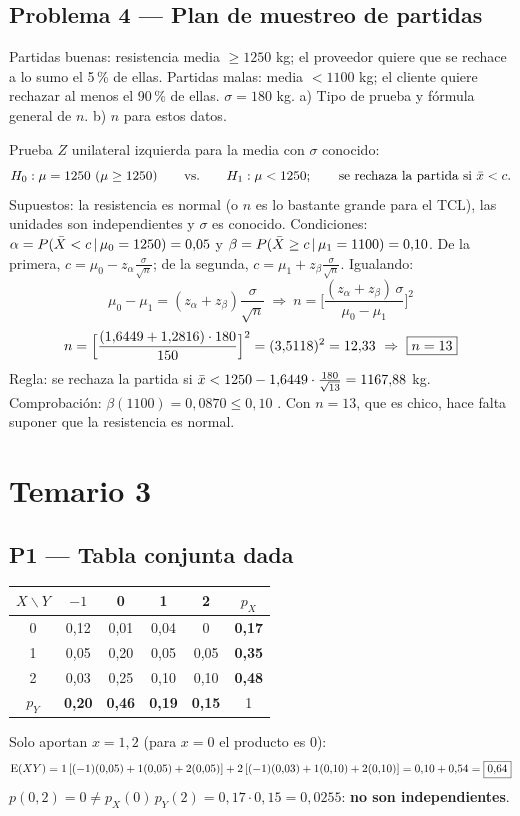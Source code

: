 \subsection{Problema 4 --- Plan de muestreo de partidas}
\begin{enun}
Partidas buenas: resistencia media $\ge1250$ kg; el proveedor quiere que se rechace a lo sumo el 5\,\% de ellas. Partidas malas: media $<1100$ kg; el cliente quiere rechazar al menos el 90\,\% de ellas. $\sigma=180$ kg. a) Tipo de prueba y fórmula general de $n$. b) $n$ para estos datos.
\end{enun}
Prueba $Z$ unilateral izquierda para la media con $\sigma$ conocido:
\[
H_0:\mu=1250\ (\mu\ge1250)\qquad\text{vs.}\qquad H_1:\mu<1250;\qquad\text{se rechaza la partida si }\xb<c.
\]
Supuestos: la resistencia es normal (o $n$ es lo bastante grande para el TCL), las unidades son independientes y $\sigma$ es conocido.
Condiciones: $\alpha=P(\bar{X}<c\,|\,\mu_0=1250)=0{,}05$ y $\beta=P(\bar{X}\ge c\,|\,\mu_1=1100)=0{,}10$. De la primera, $c=\mu_0-z_\alpha\frac{\sigma}{\sqrt n}$; de la segunda, $c=\mu_1+z_\beta\frac{\sigma}{\sqrt n}$. Igualando:
\[
\mu_0-\mu_1=(z_\alpha+z_\beta)\frac{\sigma}{\sqrt n}\ \Rightarrow\ \boxed{n=\Big[\frac{(z_\alpha+z_\beta)\,\sigma}{\mu_0-\mu_1}\Big]^2}
\]
\[
n=\Big[\frac{(1{,}6449+1{,}2816)\cdot180}{150}\Big]^2=(3{,}5118)^2=12{,}33\ \Rightarrow\ \res{n=13}
\]
Regla: se rechaza la partida si $\bar{x}<1250-1{,}6449\cdot\frac{180}{\sqrt{13}}=1167{,}88$ kg. Comprobación: $\beta(1100)=0{,}0870\le0{,}10$ \checkmark. Con $n=13$, que es chico, hace falta suponer que la resistencia es normal.

\newpage
\section{Temario 3}

\subsection{P1 --- Tabla conjunta dada}
\begin{center}
\renewcommand{\arraystretch}{1.2}
\begin{tabular}{@{}c|cccc|c@{}}
\toprule
$X\backslash Y$ & $-1$ & 0 & 1 & 2 & $p_X$\\\midrule
0 & 0,12 & 0,01 & 0,04 & 0 & \textbf{0,17}\\
1 & 0,05 & 0,20 & 0,05 & 0,05 & \textbf{0,35}\\
2 & 0,03 & 0,25 & 0,10 & 0,10 & \textbf{0,48}\\\midrule
$p_Y$ & \textbf{0,20} & \textbf{0,46} & \textbf{0,19} & \textbf{0,15} & 1\\\bottomrule
\end{tabular}
\end{center}
Solo aportan $x=1,2$ (para $x=0$ el producto es 0):
\[
\mathrm{E}(XY)=1\,[(-1)(0{,}05)+1(0{,}05)+2(0{,}05)]+2\,[(-1)(0{,}03)+1(0{,}10)+2(0{,}10)]=0{,}10+0{,}54=\boxed{0{,}64}
\]
$p(0,2)=0\neq p_X(0)\,p_Y(2)=0{,}17\cdot0{,}15=0{,}0255$: \textbf{no son independientes}.

